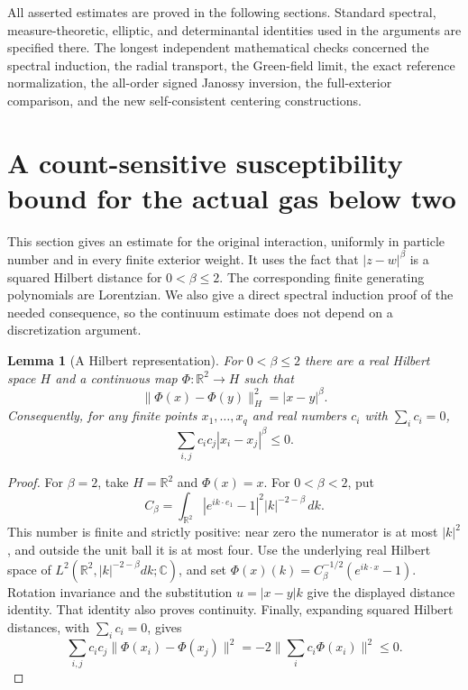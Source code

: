 \documentclass[11pt]{article}
\newtheorem{lemma}[theorem]{Lemma}
\theoremstyle{remark}\newtheorem{remark}[theorem]{Remark}
\begin{document}
All asserted estimates are proved in the following sections. Standard
spectral, measure-theoretic, elliptic, and determinantal identities
used in the arguments are specified there. The longest independent
mathematical checks concerned the spectral induction, the radial
transport, the Green-field limit, the exact reference normalization,
the all-order signed Janossy inversion, the full-exterior comparison,
and the new self-consistent centering constructions.


\section{A count-sensitive susceptibility bound for the actual gas below two}
\label{sec:lorentzian}

This section gives an estimate for the original interaction, uniformly in
particle number and in every finite exterior weight.  It uses the fact
that $|z-w|^\beta$ is a squared Hilbert distance for $0<\beta\le2$.
The corresponding finite generating polynomials are Lorentzian.  We
also give a direct spectral induction proof of the needed consequence,
so the continuum estimate does not depend on a discretization argument.

\begin{lemma}[A Hilbert representation]
\label{lem:distance-negative-type}
For $0<\beta\le2$ there are a real Hilbert space $H$ and a continuous
map $\Phi:\mathbb R^2\to H$ such that
\[
 \|\Phi(x)-\Phi(y)\|_H^2=|x-y|^\beta.
\]
Consequently, for any finite points $x_1,\ldots,x_q$ and real numbers
$c_i$ with $\sum_i c_i=0$,
\[
 \sum_{i,j}c_ic_j|x_i-x_j|^\beta\le0.
\]
\end{lemma}

\begin{proof}
For $\beta=2$, take $H=\mathbb R^2$ and $\Phi(x)=x$.
For $0<\beta<2$, put
\[
 C_\beta=\int_{\mathbb R^2}
       |e^{ik\cdot e_1}-1|^2|k|^{-2-\beta}\,dk.
\]
This number is finite and strictly positive: near zero the numerator
is at most $|k|^2$, and outside the unit ball it is at most four.
Use the underlying real Hilbert space of
$L^2(\mathbb R^2,|k|^{-2-\beta}dk;\mathbb C)$, and set
$\Phi(x)(k)=C_\beta^{-1/2}(e^{ik\cdot x}-1)$.
Rotation invariance and the substitution $u=|x-y|k$ give the displayed
distance identity.  That identity also proves continuity.  Finally,
expanding squared Hilbert distances, with $\sum_i c_i=0$, gives
\[
 \sum_{i,j}c_ic_j\|\Phi(x_i)-\Phi(x_j)\|^2
 =-2\Big\|\sum_i c_i\Phi(x_i)\Big\|^2\le0.
\]
\end{proof}
\end{document}

